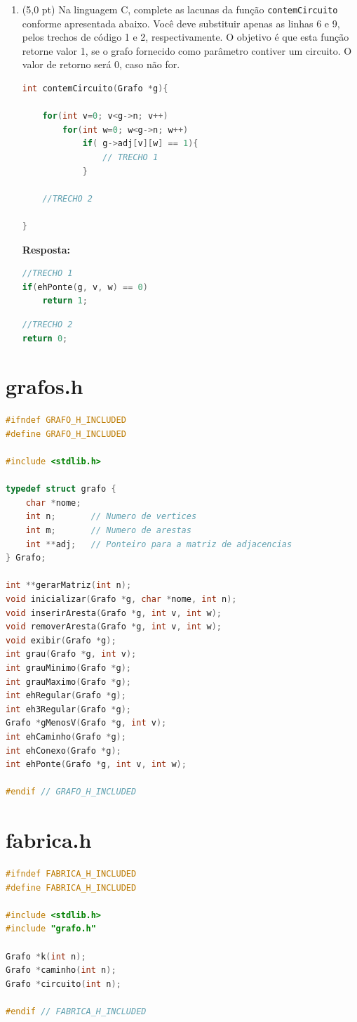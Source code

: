 \documentclass[12pt,a4paper,oneside]{article}
\begin{document}
\begin{enumerate}
	\item (5,0 pt) Na linguagem C, complete as lacunas da função {\tt contemCircuito} conforme apresentada abaixo. Você deve substituir apenas as linhas 6 e 9, pelos trechos de código 1 e 2, respectivamente. O objetivo é que esta função retorne valor 1, se o grafo fornecido como parâmetro contiver um circuito. O valor de retorno será 0, caso não for.

\begin{lstlisting}[language=C]
int contemCircuito(Grafo *g){

	for(int v=0; v<g->n; v++)
		for(int w=0; w<g->n; w++)
			if( g->adj[v][w] == 1){
				// TRECHO 1
			}
			
	//TRECHO 2
	
}\end{lstlisting}

{\color{blue} \bf Resposta: } \\
\begin{lstlisting}[language=C]
//TRECHO 1
if(ehPonte(g, v, w) == 0)
	return 1;
\end{lstlisting}

\begin{lstlisting}[language=C]
//TRECHO 2
return 0;
\end{lstlisting}
	
\end{enumerate}

\newpage

\section{grafos.h}

\begin{lstlisting}[language=C]
#ifndef GRAFO_H_INCLUDED
#define GRAFO_H_INCLUDED

#include <stdlib.h>

typedef struct grafo {
	char *nome;
	int n;       // Numero de vertices
	int m;       // Numero de arestas
	int **adj;   // Ponteiro para a matriz de adjacencias
} Grafo;

int **gerarMatriz(int n);
void inicializar(Grafo *g, char *nome, int n);
void inserirAresta(Grafo *g, int v, int w);
void removerAresta(Grafo *g, int v, int w);
void exibir(Grafo *g);
int grau(Grafo *g, int v);
int grauMinimo(Grafo *g);
int grauMaximo(Grafo *g);
int ehRegular(Grafo *g);
int eh3Regular(Grafo *g);
Grafo *gMenosV(Grafo *g, int v);
int ehCaminho(Grafo *g);
int ehConexo(Grafo *g);
int ehPonte(Grafo *g, int v, int w);

#endif // GRAFO_H_INCLUDED\end{lstlisting}

\newpage

\section{fabrica.h}

\begin{lstlisting}[language=C]
#ifndef FABRICA_H_INCLUDED
#define FABRICA_H_INCLUDED

#include <stdlib.h>
#include "grafo.h"

Grafo *k(int n);
Grafo *caminho(int n);
Grafo *circuito(int n);

#endif // FABRICA_H_INCLUDED\end{lstlisting}
\end{document}
